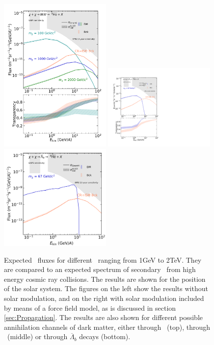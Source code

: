 \begin{figure}[hbtp]
    \includegraphics[width=0.49\textwidth]{figures/he3bar_WW_SM.png}
    \includegraphics[width=0.49\textwidth]{figures/he3bar_LambdaB_LIS.png}
    \includegraphics[width=0.49\textwidth]{figures/he3bar_LambdaB_TOA_fine.png}
    \caption{Expected \ahe\ fluxes for different \dmm\ ranging from 1GeV to 2TeV. They are compared to an expected spectrum of secondary \ahe\ from high energy cosmic ray collisions. The results are shown for the position of the solar system. The figures on the left show the results without solar modulation, and on the right with solar modulation included by means of a force field model, as is discussed in section \ref{sec:Propagation}. The results are also shown for different possible annihilation channels of dark matter, either through \WW\ (top), through \bb\ (middle) or through $\overline{\Lambda}_b$ decays (bottom).}
    \label{fig:Results_He3_fluxes_diff_DM_masses}
\end{figure}

